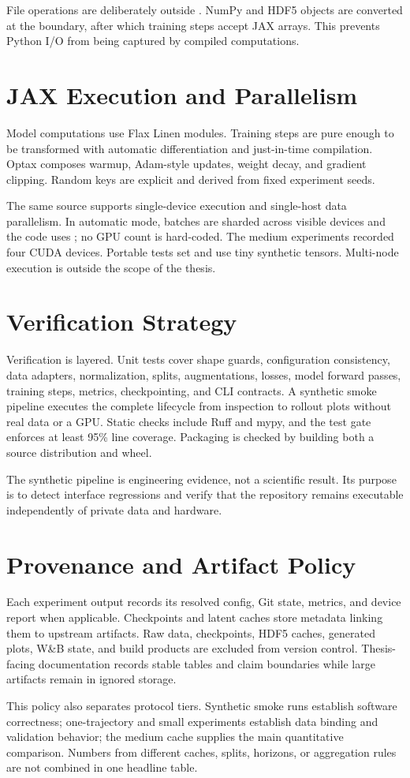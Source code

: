 File operations are deliberately outside . NumPy and HDF5 objects are converted at
the boundary, after which training steps accept JAX arrays. This prevents Python I/O from being
captured by compiled computations.

\section{JAX Execution and Parallelism}

Model computations use Flax Linen modules. Training steps are pure enough to be transformed with
automatic differentiation and just-in-time compilation. Optax composes warmup, Adam-style updates,
weight decay, and gradient clipping. Random keys are explicit and derived from fixed experiment
seeds.

The same source supports single-device execution and single-host data parallelism. In automatic
mode, batches are sharded across visible devices and the code uses ; no GPU count is
hard-coded. The medium experiments recorded four CUDA devices. Portable tests set
 and use tiny synthetic tensors. Multi-node execution is outside the
scope of the thesis.

\section{Verification Strategy}

Verification is layered. Unit tests cover shape guards, configuration consistency, data adapters,
normalization, splits, augmentations, losses, model forward passes, training steps, metrics,
checkpointing, and CLI contracts. A synthetic smoke pipeline executes the complete lifecycle from
inspection to rollout plots without real data or a GPU. Static checks include Ruff and mypy, and the
test gate enforces at least 95\% line coverage. Packaging is checked by building both a source
distribution and wheel.

The synthetic pipeline is engineering evidence, not a scientific result. Its purpose is to detect
interface regressions and verify that the repository remains executable independently of private
data and hardware.

\section{Provenance and Artifact Policy}

Each experiment output records its resolved config, Git state, metrics, and device report when
applicable. Checkpoints and latent caches store metadata linking them to upstream artifacts. Raw
data, checkpoints, HDF5 caches, generated plots, W\&B state, and build products are excluded from
version control. Thesis-facing documentation records stable tables and claim boundaries while
large artifacts remain in ignored storage.

This policy also separates protocol tiers. Synthetic smoke runs establish software correctness;
one-trajectory and small experiments establish data binding and validation behavior; the medium
cache supplies the main quantitative comparison. Numbers from different caches, splits, horizons,
or aggregation rules are not combined in one headline table.
